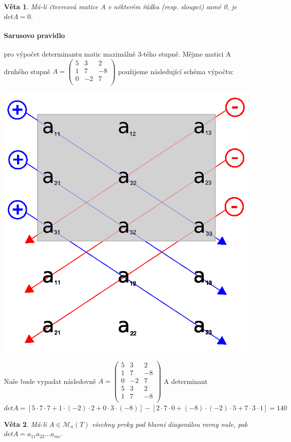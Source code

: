 \documentclass[12pt,a4paper]{article}
\newtheorem{sentence}{Věta}
\begin{document}
\begin{sentence}
	Má-li čtvercová matice A v některém řádku (resp. sloupci) samé 0, je $detA = 0$.
\end{sentence}

\paragraph{Sarusovo pravidlo} pro výpočet determinantu matic maximálně 3-tého stupně. Mějme matici A druhého stupně $A = \left( \begin{array}{ccc} 5 & 3 & 2\\ 1 & 7 & -8\\ 0 & -2 & 7\\ \end{array} \right)$ použijeme následující schéma výpočtu: 
\begin{center}
	\includegraphics[scale=0.2]{img/SarussRule}
\end{center}
Naše  bude vypadat následovně $A = \left( \begin{array}{ccc} 5 & 3 & 2\\ 1 & 7 & -8\\ 0 & -2 & 7\\ 5 & 3 & 2\\ 1 & 7 & -8\\ \end{array} \right)$ A determinant $detA = [5⋅7⋅7+1⋅(−2)⋅2+0⋅3⋅(−8)]−[2⋅7⋅0+(−8)⋅(−2)⋅5+7⋅3⋅1]=140$
\begin{sentence}
	Má-li $A \in \mathscr{M}_n(T)$ všechny prvky pod hlavní diagonálou rovny nule, pak $detA = a_{11}a_{22}\dots a_{nn}$. 
\end{sentence}
\end{document}
